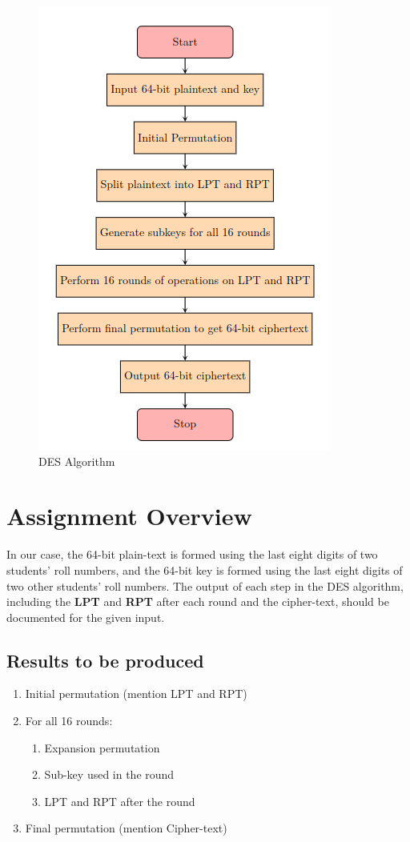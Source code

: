 \documentclass[12pt, letterpaper]{article}
\begin{document}
\begin{figure}[hbt!]
    \centering
    \includegraphics[scale=0.6, angle=0]{images/Screenshot from 2023-02-18 21-05-04.png}
    \caption{DES Algorithm}
    \label{fig:crazy}
\end{figure}



        
\section{Assignment Overview}

In our case, the 64-bit plain-text is formed using the last eight digits of two students' roll numbers, and the 64-bit key is formed using the last eight digits of two other students' roll numbers. The output of each step in the DES algorithm, including the \textbf{LPT} and \textbf{RPT} after each round and the cipher-text, should be documented for the given input.

    \subsection{Results to be produced}

    \begin{enumerate}
  \item Initial permutation (mention LPT and RPT)
  \item For all 16 rounds:
  \begin{enumerate}
    \item Expansion permutation
    \item Sub-key used in the round
    \item LPT and RPT after the round
  \end{enumerate}
  \item Final permutation (mention Cipher-text)
\end{enumerate}
\end{document}
